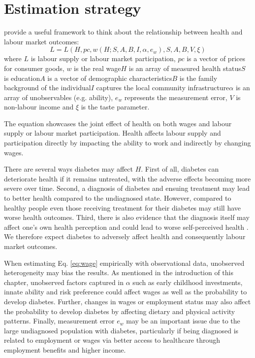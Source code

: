 
\section{\label{sec:Estimation Strategy}Estimation strategy}

\textcite{Strauss1998} provide a useful framework to think about the relationship between health and labour market outcomes:
\begin{equation}
L=L(H, pc, w(H;S,A,B,I,\alpha,e_{w}), S, A, B, V, \xi) \label{eq:wage}
\end{equation}
where $L$ is labour supply or labour market participation, $pc $ is a vector of prices for consumer goods, $w$ is the real wage\DIFdelbegin \DIFdel{; }\DIFdelend \DIFaddbegin \DIFadd{, }\DIFaddend $H$ is an array of measured health status\DIFdelbegin \DIFdel{; }\DIFdelend \DIFaddbegin \DIFadd{, }\DIFaddend $S$ is education\DIFdelbegin \DIFdel{; }\DIFdelend \DIFaddbegin \DIFadd{, }\DIFaddend $A$ is a vector of demographic characteristics\DIFdelbegin \DIFdel{; }\DIFdelend \DIFaddbegin \DIFadd{, }\DIFaddend $B$ is the family background of the individual\DIFdelbegin \DIFdel{; }\DIFdelend \DIFaddbegin \DIFadd{, }\DIFaddend $I$ captures the local community infrastructure\DIFdelbegin \DIFdel{; }\DIFdelend \DIFaddbegin \DIFadd{, }\DIFaddend $\alpha$ is an array of unobservables (e.g. ability), $e_w$ represents the measurement error, $V$ is non-labour income and $\xi$ is the taste parameter. 

The equation showcases the joint effect of health on both wages and labour supply or labour market participation. Health affects labour supply and participation directly by impacting the ability to work and indirectly by changing wages.

There are several ways diabetes may affect $H$. First of all, diabetes can deteriorate health if it remains untreated, with the adverse effects becoming more severe over time. Second, a diagnosis of diabetes and ensuing treatment may lead to better health compared to the undiagnosed state. However, compared to healthy people even those receiving treatment for their diabetes may still have worse health outcomes. Third, there is also evidence that the diagnosis itself may affect one's own health perception and could lead to worse self-perceived health \parencite{Thoolen2006}. We therefore expect diabetes to adversely affect health and consequently labour market outcomes.

When estimating Eq. \ref{eq:wage} empirically with observational data, unobserved heterogeneity may bias the results. As mentioned in the introduction of this chapter, unobserved factors captured in $\alpha$ such as early childhood investments, innate ability and risk preference could affect wages as well as the probability to develop diabetes. Further, changes in wages or employment status may also affect the probability to develop diabetes by affecting dietary and physical activity patterns. Finally, measurement error $e_w$ may be an important issue due to the large undiagnosed population with diabetes, particularly if being diagnosed is related to employment or wages via better access to healthcare through employment benefits and higher income.

